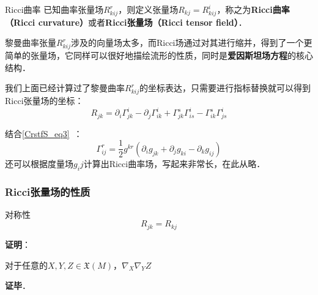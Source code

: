 \begin{definition}{Ricci曲率}
已知曲率张量场$R^r_{kij}$，则定义张量场$R_{kj}=R^i_{kij}$，称之为\textbf{Ricci曲率（Ricci curvature）}或者\textbf{Ricci张量场（Ricci tensor field）}．
\end{definition}

黎曼曲率张量$R^r_{kij}$涉及的向量场太多，而Ricci场通过对其进行缩并，得到了一个更简单的张量场，它同样可以很好地描绘流形的性质，同时是\textbf{爱因斯坦场方程}的核心结构．

我们上面已经计算过了黎曼曲率$R^r_{kij}$的坐标表达，只需要进行指标替换就可以得到Ricci张量场的坐标：
\begin{equation}
R_{jk}=\partial_i\Gamma^i_{jk}-\partial_j\Gamma^{i}_{ik}+\Gamma^s_{jk}\Gamma^i_{is}-\Gamma^s_{ik}\Gamma^i_{js}
\end{equation}

结合\autoref{CrstfS_eq3}~：
\begin{equation}
\Gamma^{r}_{ij}=\frac{1}{2}g^{kr}(\partial_ig_{jk}+\partial_jg_{ki}-\partial_kg_{ij})
\end{equation}
还可以根据度量场$g_ij$计算出Ricci曲率场，写起来非常长，在此从略．

\subsubsection{Ricci张量场的性质}

\begin{theorem}{对称性}
\begin{equation}
R_{jk}=R_{kj}
\end{equation}
\end{theorem}

\textbf{证明}：

对于任意的$X, Y, Z\in\mathfrak{X}(M)$，$\nabla_{X}\nabla_{Y}Z$

\textbf{证毕}．


















